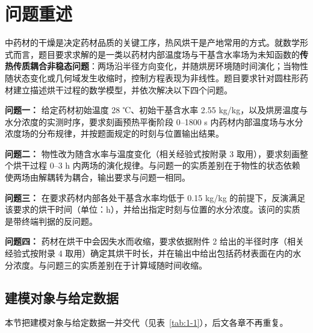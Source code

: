 \section{问题重述}
中药材的干燥是决定药材品质的关键工序，热风烘干是产地常用的方式。就数学形式而言，题目要求求解的是一类以药材内部温度场与干基含水率场为未知函数的\textbf{传热传质耦合非稳态问题}：两场沿半径方向变化，并随烘房环境随时间演化；当物性随状态变化或几何域发生收缩时，控制方程表现为非线性。题目要求针对圆柱形药材建立描述烘干过程的数学模型，并依次解决以下四个问题。

\textbf{问题一：} 给定药材初始温度 28 ℃、初始干基含水率 2.55 kg/kg，以及烘房温度与水分浓度的实测时序，要求刻画预热平衡阶段 0–1800 s 内药材内部温度场与水分浓度场的分布规律，并按题面规定的时刻与位置输出结果。

\textbf{问题二：} 物性改为随含水率与温度变化（相关经验式按附录 3 取用），要求刻画整个烘干过程 0–3 h 内两场的演化规律。与问题一的实质差别在于物性的状态依赖使两场由解耦转为耦合，输出要求与问题一相同。

\textbf{问题三：} 在要求药材内部各处干基含水率均低于 0.15 kg/kg 的前提下，反演满足该要求的烘干时间（单位：h），并给出指定时刻与位置的水分浓度。该问的实质是带终端判据的反问题。

\textbf{问题四：} 药材在烘干中会因失水而收缩，要求依据附件 2 给出的半径时序（相关经验式按附录 4 取用）确定其烘干时长，并在输出中给出包括药材表面在内的水分浓度。与问题三的实质差别在于计算域随时间收缩。

\subsection{建模对象与给定数据}
本节把建模对象与给定数据一并交代（见表~\ref{tab:1-1}），后文各章不再重复。



